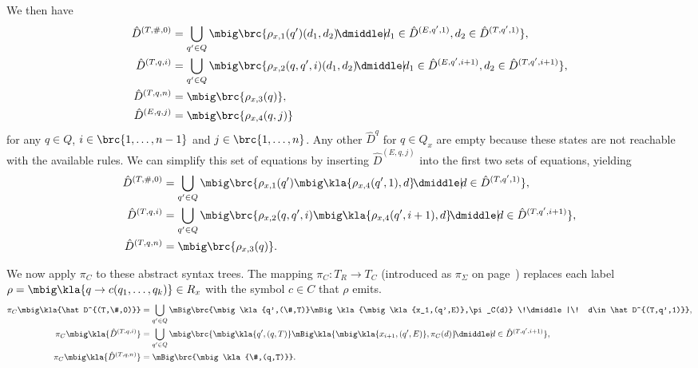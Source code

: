 We then have
\begin{align*}
 \hat D^{(T,\#,0)} &= \bigcup_{q'\in Q} \mbig\brc{\rho_{x,1}(q')(d_1,d_2) \!\dmiddle|\! d_1\in\hat D^{(E,q',1)}, d_2\in\hat D^{(T,q',1)}}, \\
 \hat D^{(T,q,i)} &= \bigcup_{q'\in Q} \mbig\brc{\rho_{x,2}(q,q',i)(d_1,d_2) \!\dmiddle|\! d_1\in\hat D^{(E,q',i+1)}, d_2\in\hat D^{(T,q',i+1)}}, \\
 \hat D^{(T,q,n)} &= \mbig\brc{\rho_{x,3}(q)}, \\
 \hat D^{(E,q,j)} &= \mbig\brc{\rho_{x,4}(q,j)}
\end{align*}
for any $q\in Q$, $i\in\brc{1,\ldots,n-1}$ and $j\in\brc{1,\ldots,n}$. Any
other $\hat D^q$ for $q\in Q_x$ are empty because these states are not
reachable with the available rules. We can simplify this set of equations by
inserting $\hat D^{(E,q,j)}$ into the first two sets of equations, yielding
\begin{align*}
 \hat D^{(T,\#,0)} &= \bigcup_{q'\in Q} \mbig\brc{\rho_{x,1}(q')\mbig\kla{\rho_{x,4}(q',1),d} \!\dmiddle|\! d\in\hat D^{(T,q',1)}}, \\
 \hat D^{(T,q,i)} &= \bigcup_{q'\in Q} \mbig\brc{\rho_{x,2}(q,q',i)\mbig\kla{\rho_{x,4}(q',i+1),d} \!\dmiddle|\! d\in\hat D^{(T,q',i+1)}}, \\
 \hat D^{(T,q,n)} &= \mbig\brc{\rho_{x,3}(q)}.
\end{align*}

We now apply $\pi_C$ to these abstract syntax trees. The mapping $\pi_C:T_R\to
T_C$ (introduced as $\pi_\Sigma$ on page~\pageref{def:02-pi-sigma}) replaces
each label $\rho=\mbig\kla{q\to c(q_1,\ldots,q_k)}\in R_x$ with the symbol
$c\in C$ that $\rho$ emits.
\begin{align*}
 \pi_C\mbig\kla{\hat D^{(T,\#,0)}} &= \bigcup_{q'\in Q} \mBig\brc{\mbig\kla{q',(\#,T)}\mBig\kla{\mbig\kla{x_1,(q',E)},\pi_C(d)} \!\dmiddle|\! d\in\hat D^{(T,q',1)}}, \\
 \pi_C\mbig\kla{\hat D^{(T,q,i)}} &= \bigcup_{q'\in Q} \mbig\brc{\mbig\kla{q',(q,T)}\mBig\kla{\mbig\kla{x_{i+1},(q',E)},\pi_C(d)} \!\dmiddle|\! d\in\hat D^{(T,q',i+1)}}, \\
 \pi_C\mbig\kla{\hat D^{(T,q,n)}} &= \mBig\brc{\mbig\kla{\#,(q,T)}}.
\end{align*}

